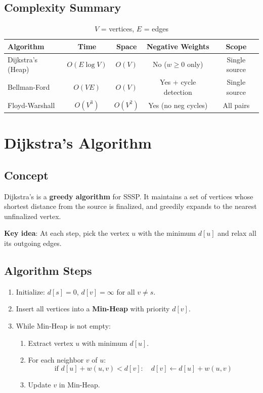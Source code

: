 \documentclass[12pt,a4paper]{article}
\begin{document}
\subsection{Complexity Summary}
\begin{table}[h!]
\centering
\renewcommand{\arraystretch}{1.4}
\begin{tabular}{|l|c|c|c|c|}
\hline
\textbf{Algorithm}    & \textbf{Time}  & \textbf{Space} & \textbf{Negative Weights} & \textbf{Scope} \\
\hline
Dijkstra's (Heap)     & $O(E \log V)$  & $O(V)$         & No ($w \geq 0$ only)      & Single source  \\
Bellman-Ford          & $O(VE)$        & $O(V)$         & Yes + cycle detection     & Single source  \\
Floyd-Warshall        & $O(V^3)$       & $O(V^2)$       & Yes (no neg cycles)       & All pairs      \\
\hline
\end{tabular}
\caption{$V$ = vertices, $E$ = edges}
\end{table}

\newpage

\section{Dijkstra's Algorithm}

\subsection{Concept}
Dijkstra's is a \textbf{greedy algorithm} for SSSP. It maintains a set of vertices whose shortest distance from the source is finalized, and greedily expands to the nearest unfinalized vertex.

\textbf{Key idea}: At each step, pick the vertex $u$ with the minimum $d[u]$ and relax all its outgoing edges.

\subsection{Algorithm Steps}
\begin{enumerate}
    \item Initialize: $d[s] = 0$, $d[v] = \infty$ for all $v \ne s$.
    \item Insert all vertices into a \textbf{Min-Heap} with priority $d[v]$.
    \item While Min-Heap is not empty:
    \begin{enumerate}
        \item Extract vertex $u$ with minimum $d[u]$.
        \item For each neighbor $v$ of $u$:
        \[
        \text{if } d[u] + w(u,v) < d[v]:\quad d[v] \leftarrow d[u] + w(u,v)
        \]
        \item Update $v$ in Min-Heap.
    \end{enumerate}
\end{enumerate}
\end{document}
